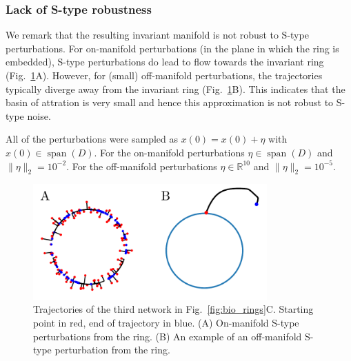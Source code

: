 \documentclass{article} %
\newcounter{ct}
\newcommand{\reals}{\mathbb{R}}
\theoremstyle{definition}
\theoremstyle{remark}
\begin{document}
\subsubsection{Lack of S-type robustness}\label{sec:empjnonrobust}
We remark that the resulting invariant manifold is not robust to S-type perturbations.
For on-manifold perturbations (in the plane in which the ring is embedded), S-type perturbations do lead to flow towards the invariant ring (Fig.~\ref{fig:empj_onoff_perturbation}A).
However, for (small) off-manifold perturbations, the trajectories typically diverge away from the invariant ring (Fig.~\ref{fig:empj_onoff_perturbation}B).
This indicates that the basin of attration is very small and hence this approximation is not robust to S-type noise.


All of the perturbations were sampled as
\(x(0) = x(0) + \eta\) with \(x(0)\in \operatorname{span}(D)\).
For the on-manifold perturbations \(\eta\in \operatorname{span}(D)\)  and \(\|\eta\|_2=10^{-2}\).
For the off-manifold perturbations \(\eta\in \reals^{10}\) and \(\|\eta\|_2=10^{-5}\).


\begin{figure}[h]
\centering
\includegraphics[width=0.8\textwidth]{empj_onoff_perturbation}
\caption{Trajectories of the third network in Fig.~\ref{fig:bio_rings}C. Starting point in red, end of trajectory in blue.
(A) On-manifold S-type perturbations from the ring.
(B) An example of an off-manifold  S-type perturbation from the ring.
}\label{fig:empj_onoff_perturbation}
\end{figure}






\end{document}
